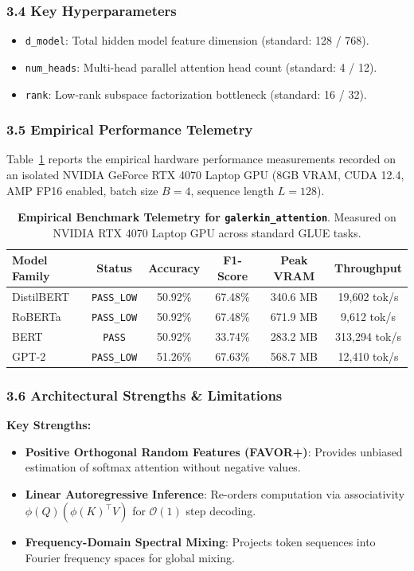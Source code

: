 \subsubsection*{3.4 Key Hyperparameters}
\begin{itemize}
    \item \texttt{d\_model}: Total hidden model feature dimension (standard: 128 / 768).
    \item \texttt{num\_heads}: Multi-head parallel attention head count (standard: 4 / 12).
    \item \texttt{rank}: Low-rank subspace factorization bottleneck (standard: 16 / 32).
\end{itemize}

\subsubsection*{3.5 Empirical Performance Telemetry}
Table~\ref{tab:telemetry_galerkin_attention} reports the empirical hardware performance measurements recorded on an isolated NVIDIA GeForce RTX 4070 Laptop GPU (8GB VRAM, CUDA 12.4, AMP FP16 enabled, batch size $B=4$, sequence length $L=128$).

\begin{table}[h]
\centering
\small
\caption{\textbf{Empirical Benchmark Telemetry for \texttt{galerkin\_attention}}. Measured on NVIDIA RTX 4070 Laptop GPU across standard GLUE tasks.}
\label{tab:telemetry_galerkin_attention}
\begin{tabular*}{\columnwidth}{@{\extracolsep{\fill}}lccccc}
\toprule
\textbf{Model Family} & \textbf{Status} & \textbf{Accuracy} & \textbf{F1-Score} & \textbf{Peak VRAM} & \textbf{Throughput} \\
\midrule
DistilBERT & \texttt{PASS\_LOW} & 50.92\% & 67.48\% & 340.6 MB & 19,602 tok/s \\
RoBERTa & \texttt{PASS\_LOW} & 50.92\% & 67.48\% & 671.9 MB & 9,612 tok/s \\
BERT & \texttt{PASS} & 50.92\% & 33.74\% & 283.2 MB & 313,294 tok/s \\
GPT-2 & \texttt{PASS\_LOW} & 51.26\% & 67.63\% & 568.7 MB & 12,410 tok/s \\
\bottomrule
\end{tabular*}
\end{table}

\subsubsection*{3.6 Architectural Strengths \& Limitations}
\textbf{Key Strengths:}
\begin{itemize}
    \item \textbf{Positive Orthogonal Random Features (FAVOR+)}: Provides unbiased estimation of softmax attention without negative values.
    \item \textbf{Linear Autoregressive Inference}: Re-orders computation via associativity $\phi(Q) (\phi(K)^\top V)$ for $\mathcal{O}(1)$ step decoding.
    \item \textbf{Frequency-Domain Spectral Mixing}: Projects token sequences into Fourier frequency spaces for global mixing.
\end{itemize}

